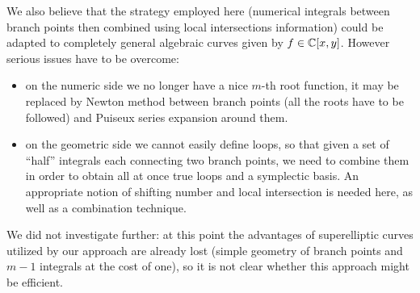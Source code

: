 \documentclass[main.tex]{subfiles}
\begin{document}
  \medskip
  
  We also believe that the strategy employed here (numerical integrals between
  branch points then combined using local intersections information) could
  be adapted to completely general algebraic curves given by $f \in \mathbb{C}[x,y]$.
  However serious issues have to be overcome:
  \begin{itemize}
      \item on the numeric side we no longer have a nice $m$-th root function, it may be replaced by
          Newton method between branch points (all the roots have to be followed) and
          Puiseux series expansion around them.
      \item on the geometric side we cannot easily define loops, so that given a set
          of ``half'' integrals each connecting two branch points, we need to combine them in order
          to obtain all at once true loops and a symplectic basis.
          An appropriate notion of shifting number and local intersection is needed here,
          as well as a combination technique.
  \end{itemize}
  We did not investigate further: at this point the advantages
  of superelliptic curves utilized by our approach are already lost
  (simple geometry of branch points and $m-1$ integrals at the cost of one), so it is
  not clear whether this approach might be efficient.

  \biblio
  
\end{document}
